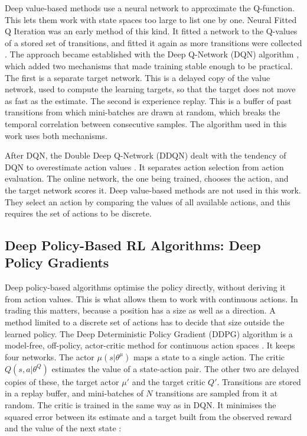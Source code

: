 Deep value-based methods use a neural network to approximate the Q-function. This lets them work with state spaces too large to list one by one. Neural Fitted Q Iteration was an early method of this kind. It fitted a network to the Q-values of a stored set of transitions, and fitted it again as more transitions were collected \cite{riedmiller_neural_2005}. The approach became established with the Deep Q-Network (DQN) algorithm \cite{mnih_human-level_2015}, which added two mechanisms that made training stable enough to be practical. The first is a separate target network. This is a delayed copy of the value network, used to compute the learning targets, so that the target does not move as fast as the estimate. The second is experience replay. This is a buffer of past transitions from which mini-batches are drawn at random, which breaks the temporal correlation between consecutive samples. The algorithm used in this work uses both mechanisms.

After DQN, the Double Deep Q-Network (DDQN) dealt with the tendency of DQN to overestimate action values \cite{van_hasselt_deep_2016}. It separates action selection from action evaluation. The online network, the one being trained, chooses the action, and the target network scores it. Deep value-based methods are not used in this work. They select an action by comparing the values of all available actions, and this requires the set of actions to be discrete.

\subsection{Deep Policy-Based RL Algorithms: Deep Policy Gradients}

Deep policy-based algorithms optimise the policy directly, without deriving it from action values. This is what allows them to work with continuous actions. In trading this matters, because a position has a size as well as a direction. A method limited to a discrete set of actions has to decide that size outside the learned policy. The Deep Deterministic Policy Gradient (DDPG) algorithm is a model-free, off-policy, actor-critic method for continuous action spaces \cite{lillicrap_continuous_2015}. It keeps four networks. The actor \( \mu(s | \theta^{\mu}) \) maps a state to a single action. The critic \( Q(s, a | \theta^{Q}) \) estimates the value of a state-action pair. The other two are delayed copies of these, the target actor \( \mu' \) and the target critic \( Q' \). Transitions are stored in a replay buffer, and mini-batches of \( N \) transitions are sampled from it at random. The critic is trained in the same way as in DQN. It minimises the squared error between its estimate and a target built from the observed reward and the value of the next state \cite{lillicrap_continuous_2015}:

